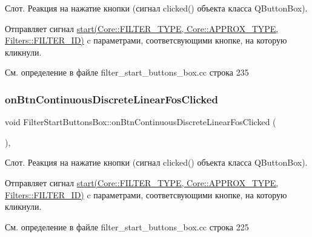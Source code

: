 Слот. Реакция на нажатие кнопки (сигнал clicked() объекта класса Q\+Button\+Box).

Отправляет сигнал \hyperlink{class_filter_start_buttons_box_ac6e2a6555f1d388391f188f834b8e753}{start(\+Core\+::\+F\+I\+L\+T\+E\+R\+\_\+\+T\+Y\+P\+E, Core\+::\+A\+P\+P\+R\+O\+X\+\_\+\+T\+Y\+P\+E, Filters\+::\+F\+I\+L\+T\+E\+R\+\_\+\+I\+D)} c параметрами, соответсвующими кнопке, на которую кликнули. 

См. определение в файле filter\+\_\+start\+\_\+buttons\+\_\+box.\+cc строка 235

\hypertarget{class_filter_start_buttons_box_a469814e3d3b955558f80ac183f3450e7}{}\label{class_filter_start_buttons_box_a469814e3d3b955558f80ac183f3450e7} 
\subsubsection{\texorpdfstring{on\+Btn\+Continuous\+Discrete\+Linear\+Fos\+Clicked}{onBtnContinuousDiscreteLinearFosClicked}}
{\footnotesize\ttfamily void Filter\+Start\+Buttons\+Box\+::on\+Btn\+Continuous\+Discrete\+Linear\+Fos\+Clicked (\begin{DoxyParamCaption}{ }\end{DoxyParamCaption})\hspace{0.3cm}{\ttfamily [private]}, {\ttfamily [slot]}}

Слот. Реакция на нажатие кнопки (сигнал clicked() объекта класса Q\+Button\+Box).

Отправляет сигнал \hyperlink{class_filter_start_buttons_box_ac6e2a6555f1d388391f188f834b8e753}{start(\+Core\+::\+F\+I\+L\+T\+E\+R\+\_\+\+T\+Y\+P\+E, Core\+::\+A\+P\+P\+R\+O\+X\+\_\+\+T\+Y\+P\+E, Filters\+::\+F\+I\+L\+T\+E\+R\+\_\+\+I\+D)} c параметрами, соответсвующими кнопке, на которую кликнули. 

См. определение в файле filter\+\_\+start\+\_\+buttons\+\_\+box.\+cc строка 225

\hypertarget{class_filter_start_buttons_box_a41f3677ea143b683d6e7d78657c9d794}{}\label{class_filter_start_buttons_box_a41f3677ea143b683d6e7d78657c9d794} 
